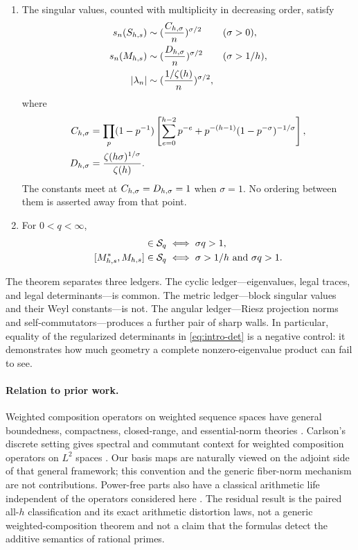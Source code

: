 \begin{theorem}
\begin{enumerate}[label=\textup{(\roman*)}]
  \item The singular values, counted with multiplicity in decreasing
  order, satisfy
  \begin{align*}
    s_n(S_{h,s})&\sim(\frac{C_{h,\sigma}}{n})^{\sigma/2}
      &&(\sigma>0),\\
    s_n(M_{h,s})&\sim(\frac{D_{h,\sigma}}{n})^{\sigma/2}
      &&(\sigma>1/h),\\
    |\lambda_n|&\sim
      (\frac{1/\zeta(h)}{n})^{\sigma/2},
  \end{align*}
  where
  \begin{align}
    C_{h,\sigma}
      &=\prod_p(1-p^{-1})\left[
        \sum_{e=0}^{h-2}p^{-e}
        +p^{-(h-1)}(1-p^{-\sigma})^{-1/\sigma}
        \right],
        \label{eq:intro-C}\\
    D_{h,\sigma}&=\frac{\zeta(h\sigma)^{1/\sigma}}{\zeta(h)}.
        \label{eq:intro-D}
  \end{align}
  The constants meet at $C_{h,\sigma}=D_{h,\sigma}=1$ when $\sigma=1$.  No ordering
  between them is asserted away from that point.

  \item For $0<q<\infty$,
  \begin{align*}
    [S_{h,s}^*,S_{h,s}]\in\Sq
      &\iff \sigma q>1,\\
    [M_{h,s}^*,M_{h,s}]\in\Sq
      &\iff \sigma>1/h\ \text{and}\ \sigma q>1.
  \end{align*}
\end{enumerate}
\end{theorem}

The theorem separates three ledgers.  The cyclic ledger---eigenvalues,
legal traces, and legal determinants---is common.  The metric ledger---block
singular values and their Weyl constants---is not.  The angular ledger---Riesz
projection norms and self-commutators---produces a further pair of sharp
walls.  In particular, equality of the regularized determinants in
\cref{eq:intro-det} is a negative control: it demonstrates how much
geometry a complete nonzero-eigenvalue product can fail to see.

\paragraph{Relation to prior work.}
Weighted composition operators on weighted sequence spaces have general
boundedness, compactness, closed-range, and essential-norm theories
\cite{LuanKhoi2015,AbaninMannanikov2023}.  Carlson's discrete setting gives
spectral and commutant context for weighted composition operators on
$L^2$ spaces \cite{Carlson1990}.  Our basis maps are naturally viewed on the
adjoint side of that general framework; this convention and the generic
fiber-norm mechanism are not contributions.  Power-free parts also have a
classical arithmetic life independent of the operators considered here
\cite{deWegerWoestijne1999}.  The residual result is the paired all-$h$
classification and its exact arithmetic distortion laws, not a generic
weighted-composition theorem and not a claim that the formulas detect the
additive semantics of rational primes.

